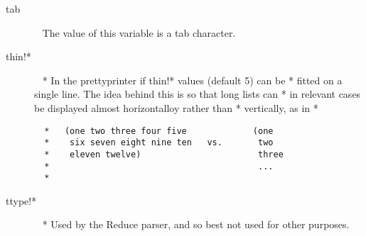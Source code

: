 \documentclass[a4paper,11pt]{article}
\begin{document}
\begin{description}
\item [{\ttfamily tab}]  ~\newline
The value of this variable is a tab character.

\item [{\ttfamily thin!*}]  ~\newline
  * In the prettyprinter if {\ttfamily thin!*} values (default 5) can be
  * fitted on a single line. The idea behind this is so that long lists can
  * in relevant cases be displayed almost horizontalloy rather than
  * vertically, as in
  * {\footnotesize\begin{verbatim}
  *   (one two three four five             (one
  *    six seven eight nine ten   vs.       two
  *    eleven twelve)                       three
  *                                         ...
  * \end{verbatim}}

\item [{\ttfamily ttype!*}]  ~\newline
  * Used by the Reduce parser, and so best not used for other purposes.

\end{description} %

\end{document}

